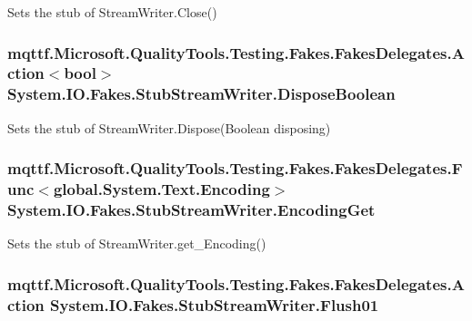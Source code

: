 Sets the stub of Stream\-Writer.\-Close()

\hypertarget{class_system_1_1_i_o_1_1_fakes_1_1_stub_stream_writer_a23dc43f88b9cbf634623ab92604e7882}{
\subsubsection[{Dispose\-Boolean}]{\setlength{\rightskip}{0pt plus 5cm}mqttf.\-Microsoft.\-Quality\-Tools.\-Testing.\-Fakes.\-Fakes\-Delegates.\-Action$<$bool$>$ System.\-I\-O.\-Fakes.\-Stub\-Stream\-Writer.\-Dispose\-Boolean}}\label{class_system_1_1_i_o_1_1_fakes_1_1_stub_stream_writer_a23dc43f88b9cbf634623ab92604e7882}


Sets the stub of Stream\-Writer.\-Dispose(\-Boolean disposing)

\hypertarget{class_system_1_1_i_o_1_1_fakes_1_1_stub_stream_writer_ab8453a15569ef8291ebe08b308ef64f7}{
\subsubsection[{Encoding\-Get}]{\setlength{\rightskip}{0pt plus 5cm}mqttf.\-Microsoft.\-Quality\-Tools.\-Testing.\-Fakes.\-Fakes\-Delegates.\-Func$<$global.\-System.\-Text.\-Encoding$>$ System.\-I\-O.\-Fakes.\-Stub\-Stream\-Writer.\-Encoding\-Get}}\label{class_system_1_1_i_o_1_1_fakes_1_1_stub_stream_writer_ab8453a15569ef8291ebe08b308ef64f7}


Sets the stub of Stream\-Writer.\-get\-\_\-\-Encoding()

\hypertarget{class_system_1_1_i_o_1_1_fakes_1_1_stub_stream_writer_ac273e50d57c80b0039062e68db436d43}{
\subsubsection[{Flush01}]{\setlength{\rightskip}{0pt plus 5cm}mqttf.\-Microsoft.\-Quality\-Tools.\-Testing.\-Fakes.\-Fakes\-Delegates.\-Action System.\-I\-O.\-Fakes.\-Stub\-Stream\-Writer.\-Flush01}}\label{class_system_1_1_i_o_1_1_fakes_1_1_stub_stream_writer_ac273e50d57c80b0039062e68db436d43}


